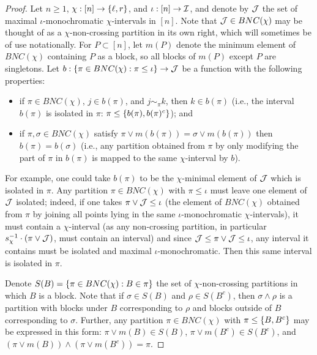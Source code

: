 \begin{proof}
	Let $n \geq 1$, $\chi : [n] \to \left\{\ell, r\right\}$, and $\iota : [n] \to \mathcal{I}$, and denote by $\mathcal{J}$ the set of maximal $\iota$-monochromatic $\chi$-intervals in $[n]$.
	Note that $\mathcal{J} \in BNC(\chi)$ may be thought of as a $\chi$-non-crossing partition in its own right, which will sometimes be of use notationally.
	For $P \subset [n]$, let $m(P)$ denote the minimum element of $BNC(\chi)$ containing $P$ as a block, so all blocks of $m(P)$ except $P$ are singletons.
	Let $b : \left\{\pi \in BNC(\chi) : \pi \leq \iota\right\} \to \mathcal{J}$ be a function with the following properties:
	\begin{itemize}
		\item if $\pi \in BNC(\chi)$, $j \in b(\pi)$, and $j \sim_\pi k$, then $k \in b(\pi)$ (i.e., the interval $b(\pi)$ is isolated in $\pi$: $\pi \leq \left\{b(\pi), b(\pi)^c\right\}$); and
		\item if $\pi, \sigma \in BNC(\chi)$ satisfy $\pi\vee m(b(\pi)) = \sigma \vee m(b(\pi))$ then $b(\pi) = b(\sigma)$ (i.e., any partition obtained from $\pi$ by only modifying the part of $\pi$ in $b(\pi)$ is mapped to the same $\chi$-interval by $b$).
	\end{itemize}
	For example, one could take $b(\pi)$ to be the $\chi$-minimal element of $\mathcal{J}$ which is isolated in $\pi$.
	Any partition $\pi \in BNC(\chi)$ with $\pi \leq \iota$ must leave one element of $\mathcal{J}$ isolated; indeed, if one takes $\pi \vee \mathcal{J} \leq \iota$ (the element of $BNC(\chi)$ obtained from $\pi$ by joining all points lying in the same $\iota$-monochromatic $\chi$-intervals), it must contain a $\chi$-interval (as any non-crossing partition, in particular $s_\chi^{-1}\cdot (\pi\vee\mathcal{J})$, must contain an interval) and since $\mathcal{J} \leq \pi \vee \mathcal{J} \leq \iota$, any interval it contains must be isolated and maximal $\iota$-monochromatic.
	Then this same interval is isolated in $\pi$.

	Denote $S(B) = \left\{\pi \in BNC(\chi) : B \in \pi\right\}$ the set of $\chi$-non-crossing partitions in which $B$ is a block.
	Note that if $\sigma \in S(B)$ and $\rho \in S(B^c)$, then $\sigma \wedge \rho$ is a partition with blocks under $B$ corresponding to $\rho$ and blocks outside of $B$ corresponding to $\sigma$.
	Further, any partition $\pi \in BNC(\chi)$ with $\pi \leq \left\{B, B^c\right\}$ may be expressed in this form: $\pi \vee m(B) \in S(B)$, $\pi \vee m(B^c) \in S(B^c)$, and $(\pi \vee m(B))\wedge(\pi\vee m(B^c)) = \pi$.


\end{proof}
